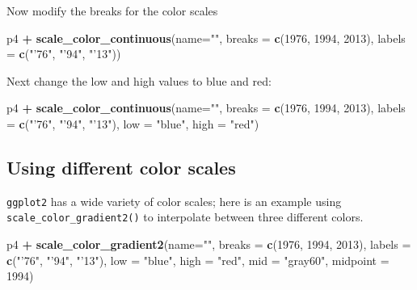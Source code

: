 \documentclass[]{book}
\newenvironment{Shaded}{\begin{snugshade}}{\end{snugshade}}
\newcommand{\DataTypeTok}[1]{\textcolor[rgb]{0.13,0.29,0.53}{#1}}
\newcommand{\DecValTok}[1]{\textcolor[rgb]{0.00,0.00,0.81}{#1}}
\newcommand{\KeywordTok}[1]{\textcolor[rgb]{0.13,0.29,0.53}{\textbf{#1}}}
\newcommand{\NormalTok}[1]{#1}
\newcommand{\OperatorTok}[1]{\textcolor[rgb]{0.81,0.36,0.00}{\textbf{#1}}}
\newcommand{\StringTok}[1]{\textcolor[rgb]{0.31,0.60,0.02}{#1}}
\begin{document}
Now modify the breaks for the color scales

\begin{Shaded}
\begin{Highlighting}[]
\NormalTok{p4 }\OperatorTok{+}\StringTok{ }
\StringTok{  }\KeywordTok{scale_color_continuous}\NormalTok{(}\DataTypeTok{name=}\StringTok{""}\NormalTok{,}
                         \DataTypeTok{breaks =} \KeywordTok{c}\NormalTok{(}\DecValTok{1976}\NormalTok{, }\DecValTok{1994}\NormalTok{, }\DecValTok{2013}\NormalTok{),}
                         \DataTypeTok{labels =} \KeywordTok{c}\NormalTok{(}\StringTok{"'76"}\NormalTok{, }\StringTok{"'94"}\NormalTok{, }\StringTok{"'13"}\NormalTok{))}
\end{Highlighting}
\end{Shaded}

Next change the low and high values to blue and red:

\begin{Shaded}
\begin{Highlighting}[]
\NormalTok{p4 }\OperatorTok{+}
\StringTok{  }\KeywordTok{scale_color_continuous}\NormalTok{(}\DataTypeTok{name=}\StringTok{""}\NormalTok{,}
                         \DataTypeTok{breaks =} \KeywordTok{c}\NormalTok{(}\DecValTok{1976}\NormalTok{, }\DecValTok{1994}\NormalTok{, }\DecValTok{2013}\NormalTok{),}
                         \DataTypeTok{labels =} \KeywordTok{c}\NormalTok{(}\StringTok{"'76"}\NormalTok{, }\StringTok{"'94"}\NormalTok{, }\StringTok{"'13"}\NormalTok{),}
                         \DataTypeTok{low =} \StringTok{"blue"}\NormalTok{, }\DataTypeTok{high =} \StringTok{"red"}\NormalTok{)}
\end{Highlighting}
\end{Shaded}

\hypertarget{using-different-color-scales}{%
\subsection{Using different color scales}\label{using-different-color-scales}}

\texttt{ggplot2} has a wide variety of color scales; here is an example using \texttt{scale\_color\_gradient2()} to interpolate between three different colors.

\begin{Shaded}
\begin{Highlighting}[]
\NormalTok{p4 }\OperatorTok{+}
\StringTok{  }\KeywordTok{scale_color_gradient2}\NormalTok{(}\DataTypeTok{name=}\StringTok{""}\NormalTok{,}
                        \DataTypeTok{breaks =} \KeywordTok{c}\NormalTok{(}\DecValTok{1976}\NormalTok{, }\DecValTok{1994}\NormalTok{, }\DecValTok{2013}\NormalTok{),}
                        \DataTypeTok{labels =} \KeywordTok{c}\NormalTok{(}\StringTok{"'76"}\NormalTok{, }\StringTok{"'94"}\NormalTok{, }\StringTok{"'13"}\NormalTok{),}
                        \DataTypeTok{low =} \StringTok{"blue"}\NormalTok{,}
                        \DataTypeTok{high =} \StringTok{"red"}\NormalTok{,}
                        \DataTypeTok{mid =} \StringTok{"gray60"}\NormalTok{,}
                        \DataTypeTok{midpoint =} \DecValTok{1994}\NormalTok{)}
\end{Highlighting}
\end{Shaded}
\end{document}
